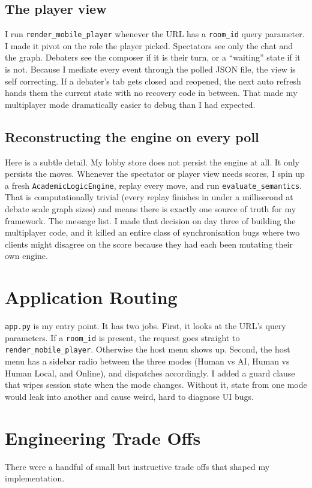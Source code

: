 \subsection{The player view}
I run \texttt{render\_mobile\_player} whenever the URL has a \texttt{room\_id} query parameter. I made it pivot on the role the player picked. Spectators see only the chat and the graph. Debaters see the composer if it is their turn, or a ``waiting'' state if it is not. Because I mediate every event through the polled JSON file, the view is self correcting. If a debater's tab gets closed and reopened, the next auto refresh hands them the current state with no recovery code in between. That made my multiplayer mode dramatically easier to debug than I had expected.

\subsection{Reconstructing the engine on every poll}
Here is a subtle detail. My lobby store does not persist the engine at all. It only persists the moves. Whenever the spectator or player view needs scores, I spin up a fresh \texttt{AcademicLogicEngine}, replay every move, and run \texttt{evaluate\_semantics}. That is computationally trivial (every replay finishes in under a millisecond at debate scale graph sizes) and means there is exactly one source of truth for my framework. The message list. I made that decision on day three of building the multiplayer code, and it killed an entire class of synchronisation bugs where two clients might disagree on the score because they had each been mutating their own engine.

\section{Application Routing}
\texttt{app.py} is my entry point. It has two jobs. First, it looks at the URL's query parameters. If a \texttt{room\_id} is present, the request goes straight to \texttt{render\_mobile\_player}. Otherwise the host menu shows up. Second, the host menu has a sidebar radio between the three modes (Human vs AI, Human vs Human Local, and Online), and dispatches accordingly. I added a guard clause that wipes session state when the mode changes. Without it, state from one mode would leak into another and cause weird, hard to diagnose UI bugs.

\section{Engineering Trade Offs}
There were a handful of small but instructive trade offs that shaped my implementation.

